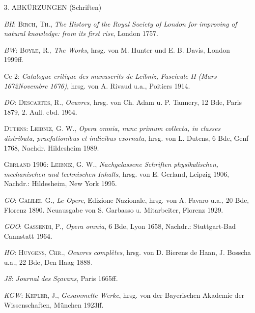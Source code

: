 \vspace{2.0ex}
\noindent\footnotesize{\uppercase{3. Abk\"{u}rzungen} (Schriften)}\par
\vspace{1.0ex}
\noindent\hangindent=10mm\textit{BH}: \textsc{Birch, Th.}, \textit{The History of the Royal Society of London for improving of natural knowledge: from its first rise}, London 1757.\par
\noindent\hangindent=10mm\textit{BW}: \textsc{Boyle, R.}, \textit{The Works}, hrsg. von M. Hunter und E. B. Davis, London 1999ff.\par
\noindent\hangindent=10mm Cc 2: \textit{Catalogue critique des manuscrits de Leibniz, Fascicule  II (Mars 1672\textendash Novembre 1676)}, hrsg. von A. Rivaud u.a., Poitiers 1914.\par
\noindent\hangindent=10mm\textit{DO}: \textsc{Descartes, R.}, \textit{Oeuvres}, hrsg. von Ch. Adam u. P. Tannery, 12 Bde, Paris 1879, 2. Aufl. ebd. 1964.\par
\noindent\hangindent=10mm\textsc{Dutens}: \textsc{Leibniz, G. W.}, \textit{Opera omnia, nunc primum collecta, in classes distributa, praefationibus et indicibus exornata}, hrsg. von L. Dutens, 6 Bde, Genf 1768, Nachdr. Hildesheim 1989.\par
\noindent\hangindent=10mm\textsc{Gerland} 1906: \textsc{Leibniz, G. W.}, \textit{Nachgelassene Schriften physikalischen, mechanischen und technischen Inhalts}, hrsg. von E. Gerland, Leipzig 1906, Nachdr.: Hildesheim, New York 1995.\par
\noindent\hangindent=10mm\textit{GO}: \textsc{Galilei, G.}, \textit{Le Opere}, Edizione Nazionale, hrsg. von A. Favaro u.a., 20 Bde, Florenz 1890. Neuausgabe von S. Garbasso u. Mitarbeiter, Florenz 1929.\par
\noindent\hangindent=10mm\textit{GOO}: \textsc{Gassendi, P.}, \textit{Opera omnia}, 6 Bde, Lyon 1658, Nachdr.: Stuttgart-Bad Cannstatt 1964.\par
\noindent\hangindent=10mm\textit{HO}: \textsc{Huygens, Chr.}, \textit{Oeuvres compl\`{e}tes}, hrsg. von D. Bierens de Haan, J. Bosscha u.a., 22 Bde, Den Haag 1888.\par
\noindent\hangindent=10mm\textit{JS}: \textit{Journal des S\c{c}avans}, Paris 1665ff.\par
\noindent\hangindent=10mm\textit{KGW}: \textsc{Kepler, J.}, \textit{Gesammelte Werke}, hrsg. von der Bayerischen Akademie der Wissenschaften, M\"{u}nchen 1923ff.\par
